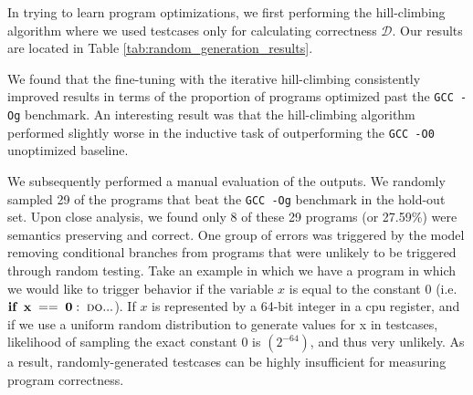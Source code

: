 \documentclass{article}
\begin{document}


In trying to learn program optimizations, we first performing the hill-climbing algorithm where we used testcases only for calculating correctness $\mathcal{D}$. Our results are located in Table \ref{tab:random_generation_results}. 

We found that the fine-tuning with the iterative hill-climbing consistently improved results in terms of the proportion of programs optimized past the \texttt{GCC -Og} benchmark. An interesting result was that the hill-climbing algorithm performed slightly worse in the inductive task of outperforming the \texttt{GCC -O0} unoptimized baseline. 

We subsequently performed a manual evaluation of the outputs. We randomly sampled 29 of the programs that beat the \texttt{GCC -Og} benchmark in the hold-out set. Upon close analysis, we found only 8 of these 29 programs (or 27.59\%) were semantics preserving and correct. One group of errors was triggered by the model removing conditional branches from programs that were unlikely to be triggered through random testing. 
%
Take an example in which we have a program in which we would like to trigger behavior if the variable $x$ is equal to the constant 0 (i.e. $\textbf{if} \;\; \mathbf{x\;==\;0:\; \textsc{do}...}$). If $x$ is represented by a 64-bit integer in a cpu register, and if we use a uniform random distribution to generate values for x in testcases,  likelihood of sampling the exact constant 0 is $(2^{-64})$, and thus very unlikely. As a result, randomly-generated testcases can be highly insufficient for measuring program correctness. 

\end{document}

